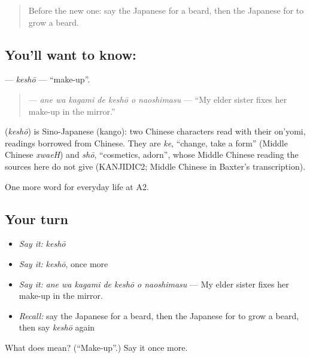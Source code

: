 \label{lesson:JA-C148-keshou}



\begin{quote}
Before the new one: say the Japanese for a beard, then the Japanese for to grow a beard.
\end{quote}

\subsection*{You'll want to know: }
\textbf{} — \emph{keshō} — \textquotedblleft{}make-up\textquotedblright{}.

\begin{quote}
\textbf{   } — \emph{ane wa kagami de keshō o naoshimasu} — \textquotedblleft{}My elder sister fixes her make-up in the mirror.\textquotedblright{}
\end{quote}

\begin{cousinweb}
\textbf{} (\emph{keshō}) is Sino-Japanese (kango): two Chinese characters read with their on'yomi, readings borrowed from Chinese. They are \emph{ke}, \textquotedblleft{}change, take a form\textquotedblright{} (Middle Chinese \emph{xwaeH}) and \emph{shō}, \textquotedblleft{}cosmetics, adorn\textquotedblright{}, whose Middle Chinese reading the sources here do not give (KANJIDIC2; Middle Chinese in Baxter's transcription).
\end{cousinweb}

\begin{grammarlens}[title={What you've built}]
One more word for everyday life at A2.
\end{grammarlens}

\subsection*{Your turn}
\begin{itemize}
\raggedright
  \item \emph{Say it:} \emph{keshō}
  \item \emph{Say it:} \emph{keshō}, once more
  \item \emph{Say it:} \emph{ane wa kagami de keshō o naoshimasu} — My elder sister fixes her make-up in the mirror.
  \item \emph{Recall:} say the Japanese for a beard, then the Japanese for to grow a beard, then say \emph{keshō} again
\end{itemize}

\begin{tcolorbox}[breakable,colback=teal!4,colframe=teal!35!black,title={Before you move on}]
What does  mean? (\textquotedblleft{}Make-up\textquotedblright{}.) Say it once more.
\end{tcolorbox}
